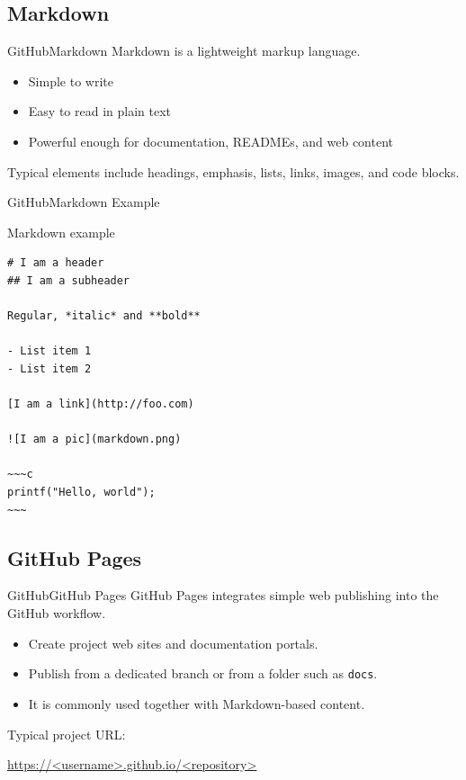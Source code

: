 \documentclass[10pt,compress]{beamer}
\begin{document}
\subsection{Markdown}

\begin{frame}[fragile]{GitHub}{Markdown}
Markdown is a lightweight markup language.

\begin{itemize}
 \item Simple to write
 \item Easy to read in plain text
 \item Powerful enough for documentation, READMEs, and web content
\end{itemize}

\bigskip

Typical elements include headings, emphasis, lists, links, images, and code blocks.
\end{frame}

\begin{frame}[fragile,shrink=8]{GitHub}{Markdown Example}
\begin{exampleblock}{Markdown example}
\begin{lstlisting}[basicstyle=\ttfamily\small]
# I am a header
## I am a subheader

Regular, *italic* and **bold**

- List item 1
- List item 2

[I am a link](http://foo.com)

![I am a pic](markdown.png)

~~~c
printf("Hello, world");
~~~
\end{lstlisting}
\end{exampleblock}
\end{frame}

\subsection{GitHub Pages}

\begin{frame}{GitHub}{GitHub Pages}
GitHub Pages integrates simple web publishing into the GitHub workflow.

\begin{itemize}
 \item Create project web sites and documentation portals.
 \item Publish from a dedicated branch or from a folder such as \texttt{docs}.
 \item It is commonly used together with Markdown-based content.
\end{itemize}

Typical project URL:

\url{https://<username>.github.io/<repository>}
\end{frame}
\end{document}
